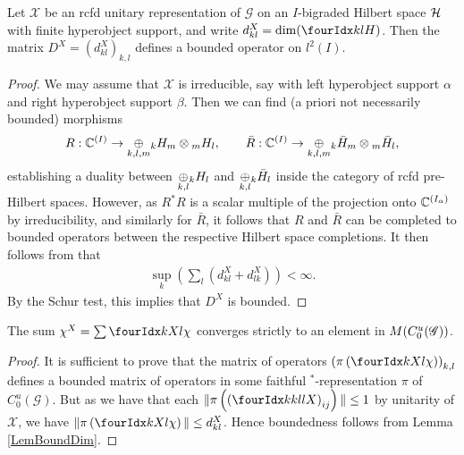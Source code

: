  \begin{Lem} \label{LemBoundDim} Let $\mathscr{X}$ be an rcfd unitary
   representation of $\mathscr{G}$ on an $I$-bigraded Hilbert space $\Hsp$ with finite hyperobject support, and write $d^X_{kl} = \dim(\Gru{H}{k}{l})$. Then the matrix $D^X = (d^X_{kl})_{k,l}$ defines a bounded operator on $l^2(I)$. 
  \end{Lem}
  \begin{proof} We may assume that $\mathscr{X}$ is irreducible, say
    with left hyperobject support $\alpha$ and right hyperobject support
    $\beta$. Then we can find (a priori not necessarily bounded)
    morphisms \[R: \C^{(I)}\rightarrow \underset{k,l,m}{\oplus} \GrDA{H}{k}{m}\otimes
    \GrDA{H}{m}{l},\qquad \bar{R}: \C^{(I)} \rightarrow \underset{k,l,m}{\oplus}
    \GrDA{\bar{H}}{k}{m}\otimes \GrDA{\bar{H}}{m}{l},\] establishing a
    duality between $\underset{k,l}{\oplus} \GrDA{H}{k}{l}$ and
    $\underset{k,l}{\oplus}\GrDA{\bar{H}}{k}{l}$ inside the category of
    rcfd pre-Hilbert spaces. However, as $R^*R$ is a scalar multiple
    of the projection onto $\C^{(I_{\alpha})}$ by irreducibility, and
    similarly for $\bar{R}$, it follows that $R$ and $\bar{R}$ can be
    completed to bounded operators between the respective Hilbert
    space completions. It then follows from \cite[Lemma A.3.2]{DCY1}
    that 
    \begin{align} \label{eq:dim-estimate}
  \sup_k (\sum_l (d_{kl}^X+d_{lk}^X)) < \infty.    
    \end{align}
 By the Schur test,
    this implies that $D^X$ is bounded.
\end{proof} 


   
\begin{Lem} The sum $\chi^X  =\sum \Gr{\chi}{}{X}{k}{l}$ converges strictly to an element in $M(\CuG)$. 
\end{Lem} 
 
\begin{proof} It is sufficient to prove that the matrix of operators $\left(\pi\left(\Gr{\chi}{}{X}{k}{l}\right)\right)_{k,l}$ defines a bounded matrix of operators in some faithful $^*$-representation $\pi$ of $C^{u}_{0}(\mathscr{G})$. But as we have that each $\|\pi\left(\left(\Gr{X}{k}{l}{k}{l}\right)_{ij}\right)\|\leq 1$ by unitarity of $\mathscr{X}$, we have $\| \pi\left(\Gr{\chi}{}{X}{k}{l}\right)\| \leq d^X_{kl}$.  Hence boundedness follows from Lemma \ref{LemBoundDim}.
\end{proof} 
 
